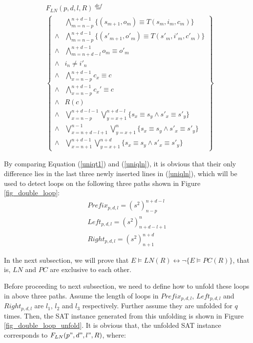 \documentclass{acm_proc_article-sp}
\begin{document}
\begin{equation}\label{uniqln}
\begin{split}
&F_{LN}(p,d,l,R)\stackrel{def}{=}\\
&\left\{
\begin{array}{cc}
&\bigwedge_{m=n-p}^{n+d-1}
\{
(s_{m+1},o_m)\equiv T(s_m,i_m,c_m)
\}
\\
\wedge&\bigwedge_{m=n-p}^{n+d-1}
\{
(s'_{m+1},o'_m)\equiv T(s'_m,i'_m,c'_m)
\}
\\
\wedge&\bigwedge_{m=n+d-l}^{n+d-1}o_m\equiv o'_m \\
\wedge& i_n\ne i'_n \\
\wedge&\bigwedge_{x=n-p}^{n+d-1}c_x\equiv c \\
\wedge&\bigwedge_{x=n-p}^{n+d-1}c_x'\equiv c \\
\wedge& R(c) \\
\wedge& \bigvee_{x=n-p}^{n+d-l-1}\bigvee_{y=x+1}^{n+d-l} \{s_x\equiv s_y\wedge s'_x\equiv s'_y\} \\
\wedge& \bigvee_{x=n+d-l+1}^{n-1}\bigvee_{y=x+1}^{n} \{s_x\equiv s_y\wedge s'_x\equiv s'_y\} \\
\wedge& \bigvee_{x=n+1}^{n+d-1}\bigvee_{y=x+1}^{n+d} \{s_x\equiv s_y\wedge s'_x\equiv s'_y\}
\end{array}
\right\}
\end{split}
\end{equation}

By comparing Equation (\ref{uniqt1}) and (\ref{uniqln}),
it is obvious that their only difference lies in the last three newly inserted lines in (\ref{uniqln}),
which will be used to detect loops on the following three paths shown in Figure \ref{fig_double_loop}:
\begin{equation}
\begin{array}{c}
Prefix_{p,d,l}=(s^2)_{n-p}^{n+d-l} \\
Left_{p,d,l}=(s^2)_{n+d-l+1}^n \\
Right_{p,d,l}=(s^2)_{n+1}^{n+d}
\end{array}
\end{equation}

In the next subsection,
we will prove that $E\vDash LN(R)\leftrightarrow \neg \{E\vDash PC(R)\}$,
that is,
$LN$ and $PC$ are exclusive to each other.



Before proceeding to next subsection,
we need to define how to unfold these loops in above three paths.
Assume the length of loops in $Prefix_{p,d,l}$, $Left_{p,d,l}$ and $Right_{p,d,l}$ are $l_1$, $l_2$ and $l_3$ respectively.
Further assume they are unfolded for $q$ times.
Then,
the SAT instance generated from this unfolding is shown in Figure \ref{fig_double_loop_unfold}.
It is obvious that,
the unfolded SAT instance corresponds to $F_{LN}(p",d",l",R)$,
where:
\end{document}
